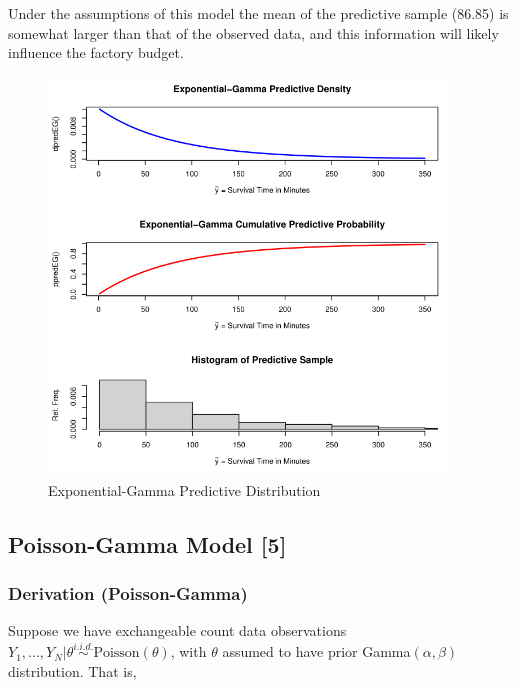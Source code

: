 \documentclass[12pt, a4paper]{article}
\begin{document}
\noindent Under the assumptions of this model the mean of the predictive sample (86.85) is somewhat larger than that of the observed data, and this information will likely influence the factory budget.


\begin{figure}[ht]
  \centering
  \includegraphics[width=0.95\textwidth]{./Graphics/DistributionPlots/ExponentialGamma}
  \caption{Exponential-Gamma Predictive Distribution}
  \label{fig:EGdist}
\end{figure}

\vspace{2cm}






\clearpage

  \subsection{Poisson-Gamma Model [5]}

    \subsubsection{Derivation (Poisson-Gamma)}

      Suppose we have exchangeable count data observations $Y_1,...,Y_N|\theta\overset{i.i.d.}{\sim}\text{Poisson}(\theta)$, with $\theta$ assumed to have prior Gamma$(\alpha,\beta)$ distribution.  That is,
\end{document}

